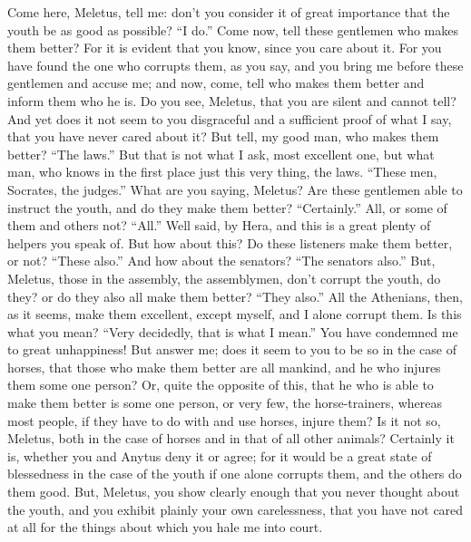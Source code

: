 Come here, Meletus, tell me: don't you consider it  of great importance that the youth be as good as possible? “I do.” Come now, tell these gentlemen who makes them better? For it is evident that you know, since you care about it. For you have found the one who corrupts them, as you say, and you bring me before these gentlemen and accuse me; and now, come, tell who makes them better and inform them who he is. Do you see, Meletus, that you are silent and cannot tell? And yet does it not seem to you disgraceful and a sufficient proof of what I say, that you have never cared about it? But tell, my good man, who  makes them better? “The laws.” But that is not what I ask, most excellent one, but what man, who knows in the first place just this very thing, the laws. “These men, Socrates, the judges.” What are you saying, Meletus? Are these gentlemen able to instruct the youth, and do they make them better? “Certainly.” All, or some of them and others not? “All.” Well said, by Hera, and this is a great plenty of helpers you speak of. But how about this?   Do these listeners make them better, or not? “These also.” And how about the senators? “The senators also.” But, Meletus, those in the assembly, the assemblymen, don't corrupt the youth, do they? or do they also all make them better? “They also.” All the Athenians, then, as it seems, make them excellent, except myself, and I alone corrupt them. Is this what you mean? “Very decidedly, that is what I mean.” You have condemned me to great unhappiness! But answer me; does it seem to you to be so in the case of horses, that those who  make them better are all mankind, and he who injures them some one person? Or, quite the opposite of this, that he who is able to make them better is some one person, or very few, the horse-trainers, whereas most people, if they have to do with and use horses, injure them? Is it not so, Meletus, both in the case of horses and in that of all other animals? Certainly it is, whether you and Anytus deny it or agree; for it would be a great state of blessedness in the case of the youth if one alone corrupts them, and the others do them good. But,  Meletus, you show clearly enough that you never thought about the youth, and you exhibit plainly your own carelessness, that you have not cared at all for the things about which you hale me into court.

